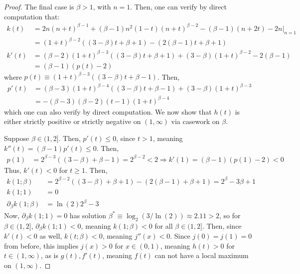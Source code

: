 \documentclass[10pt,a4paper]{amsart}
\newcommand{\p}{\partial}
\begin{document}
\begin{proof}
The final case is $\beta > 1$, with $n=1$. Then, one can verify by direct computation that:
\begin{align*}
    k(t)&=2n(n+t)^{\beta -1}+(\beta-1)n^2 (1-t)(n+t)^{\beta-2}-(\beta-1)(n+2t)-2n\bigg|_{n=1}\\
    &=(1+t)^{\beta-2}((3-\beta)t+\beta+1)-(2(\beta-1)t+\beta+1)\\
    k'(t)&=(\beta-2)(1+t)^{\beta-3}((3-\beta)t+\beta+1)+(3-\beta)(1+t)^{\beta-2}-2(\beta-1)\\
    &=(\beta-1)(p(t)-2)
\end{align*}
where $p(t)\equiv (1+t)^{\beta-3}((3-\beta)t+\beta-1)$. Then,
\begin{align*}
    p'(t)&=(\beta-3)(1+t)^{\beta-4}((3-\beta)t+\beta-1)+(3-\beta)(1+t)^{\beta-3}\\
    &=-(\beta-3)(\beta-2)(t-1)(1+t)^{\beta-4}
\end{align*}
which one can also verify by direct computation.
We now show that $h(t)$ is either strictly positive or strictly negative on $(1,\infty)$ via casework on $\beta$. 

Suppose $\beta \in (1,2]$. Then, $p'(t)\leq 0$, since $t> 1$, meaning $k''(t)=(\beta-1)p'(t)\leq 0$. Then,
\begin{align*}
    p(1)&=2^{\beta-3}((3-\beta)+\beta-1)=2^{\beta -2 }<2\Rightarrow k'(1)=(\beta-1)(p(1)-2)<0
\end{align*}
Thus, $k'(t)<0$ for $t\geq 1$. Then,
\begin{align*}
    k(1;\beta )&=2^{\beta-2}((3-\beta)+\beta+1)-(2(\beta-1)+\beta+1)=2^\beta-3\beta+1\\
    k(1;1)&=0\\
    \p_\beta k(1;\beta)&=\ln(2)2^{\beta }-3
\end{align*}
Now, $\p_\beta k(1;1)=0$ has solution $\beta^*\equiv \log_2(3/\ln(2))\approx 2.11>2$, so for $\beta \in (1,2]$, $\p_\beta k(1;1)<0$, 
meaning $k(1;\beta)<0$ for all $\beta \in (1,2]$. Then, since $k'(t)<0$ as well, $k(t;\beta)<0$, meaning $j''(x)<0$. Since $j(0)=j(1)=0$ from before, this implies $j(x)>0$ for $x\in (0,1)$, meaning $h(t)>0$ for $t\in (1,\infty)$, as is $g(t),f'(t)$, meaning $f(t)$ can not have a local maximum on $(1,\infty)$. 


\end{proof}
\end{document}
